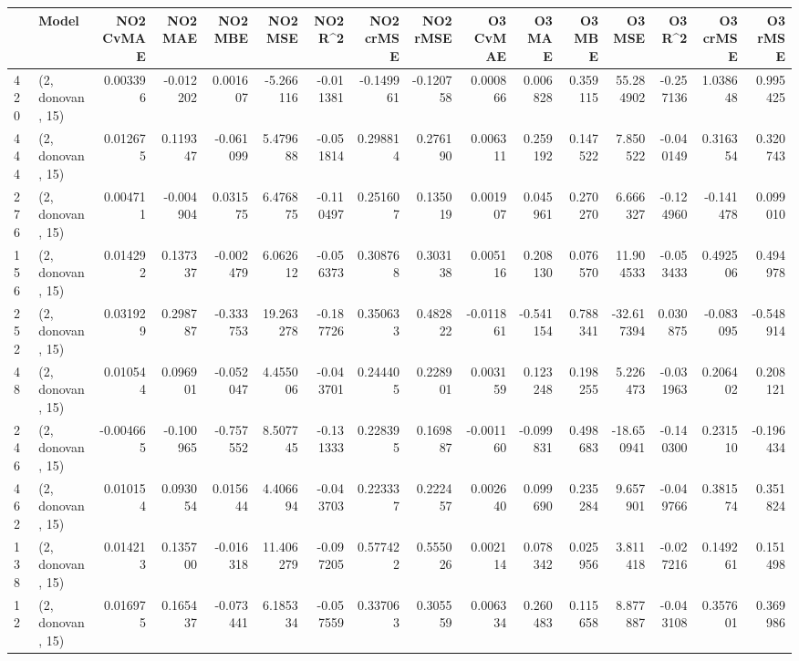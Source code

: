 \begin{tabular}{llrrrrrrrrrrrrrr}
\toprule
{} &             Model &  NO2 CvMAE &   NO2 MAE &   NO2 MBE &    NO2 MSE &   NO2 R\textasciicircum2 &  NO2 crMSE &  NO2 rMSE &  O3 CvMAE &    O3 MAE &    O3 MBE &       O3 MSE &     O3 R\textasciicircum2 &   O3 crMSE &    O3 rMSE \\
\midrule
420 &  (2, donovan, 15) &   0.003396 & -0.012202 &  0.001607 &  -5.266116 & -0.011381 &  -0.149961 & -0.120758 &  0.000866 &  0.006828 &  0.359115 &    55.284902 &  -0.257136 &   1.038648 &   0.995425 \\
444 &  (2, donovan, 15) &   0.012675 &  0.119347 & -0.061099 &   5.479688 & -0.051814 &   0.298814 &  0.276190 &  0.006311 &  0.259192 &  0.147522 &     7.850522 &  -0.040149 &   0.316354 &   0.320743 \\
276 &  (2, donovan, 15) &   0.004711 & -0.004904 &  0.031575 &   6.476875 & -0.110497 &   0.251607 &  0.135019 &  0.001907 &  0.045961 &  0.270270 &     6.666327 &  -0.124960 &  -0.141478 &   0.099010 \\
156 &  (2, donovan, 15) &   0.014292 &  0.137337 & -0.002479 &   6.062612 & -0.056373 &   0.308768 &  0.303138 &  0.005116 &  0.208130 &  0.076570 &    11.904533 &  -0.053433 &   0.492506 &   0.494978 \\
252 &  (2, donovan, 15) &   0.031929 &  0.298787 & -0.333753 &  19.263278 & -0.187726 &   0.350633 &  0.482822 & -0.011861 & -0.541154 &  0.788341 &   -32.617394 &   0.030875 &  -0.083095 &  -0.548914 \\
48  &  (2, donovan, 15) &   0.010544 &  0.096901 & -0.052047 &   4.455006 & -0.043701 &   0.244405 &  0.228901 &  0.003159 &  0.123248 &  0.198255 &     5.226473 &  -0.031963 &   0.206402 &   0.208121 \\
246 &  (2, donovan, 15) &  -0.004665 & -0.100965 & -0.757552 &   8.507745 & -0.131333 &   0.228395 &  0.169887 & -0.001160 & -0.099831 &  0.498683 &   -18.650941 &  -0.140300 &   0.231510 &  -0.196434 \\
462 &  (2, donovan, 15) &   0.010154 &  0.093054 &  0.015644 &   4.406694 & -0.043703 &   0.223337 &  0.222457 &  0.002640 &  0.099690 &  0.235284 &     9.657901 &  -0.049766 &   0.381574 &   0.351824 \\
138 &  (2, donovan, 15) &   0.014213 &  0.135700 & -0.016318 &  11.406279 & -0.097205 &   0.577422 &  0.555026 &  0.002114 &  0.078342 &  0.025956 &     3.811418 &  -0.027216 &   0.149261 &   0.151498 \\
12  &  (2, donovan, 15) &   0.016975 &  0.165437 & -0.073441 &   6.185334 & -0.057559 &   0.337063 &  0.305559 &  0.006334 &  0.260483 &  0.115658 &     8.877887 &  -0.043108 &   0.357601 &   0.369986 \\

\end{tabular}
